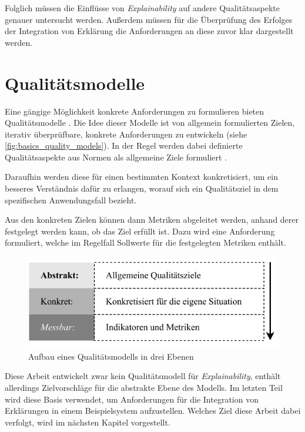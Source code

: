 Folglich müssen die Einflüsse von \textit{Explainability} auf andere Qualitätsaspekte genauer untersucht werden. Außerdem müssen für die Überprüfung des Erfolges der Integration von Erklärung die Anforderungen an diese zuvor klar dargestellt werden.

\section{Qualitätsmodelle}
\label{sec:basics_quality_models}

Eine gängige Möglichkeit konkrete Anforderungen zu formulieren bieten Qualitätsmodelle \cite{schneider2012abenteuer}. Die Idee dieser Modelle ist von allgemein formulierten Zielen, iterativ überprüfbare, konkrete Anforderungen zu entwickeln (siehe \autoref{fig:basics_quality_models}). In der Regel werden dabei definierte Qualitätsaspekte aus Normen als allgemeine Ziele formuliert \cite[vgl.][]{schneider2012abenteuer}.

Daraufhin werden diese für einen bestimmten Kontext konkretisiert, um ein besseres Verständnis dafür zu erlangen, worauf sich ein Qualitätsziel in dem spezifischen Anwendungsfall bezieht.

Aus den konkreten Zielen können dann Metriken abgeleitet werden, anhand derer festgelegt werden kann, ob das Ziel erfüllt ist. Dazu wird eine Anforderung formuliert, welche im Regelfall Sollwerte für die festgelegten Metriken enthält.

\begin{figure}[htb!]
    \centering
    \includegraphics{contents/02_basics/res/quality_models.pdf}
    \caption{Aufbau eines Qualitätsmodells in drei Ebenen \cite[S. 34, ][]{schneider2012abenteuer}}
    \label{fig:basics_quality_models}
\end{figure}

Diese Arbeit entwickelt zwar kein Qualitätsmodell für \textit{Explainability}, enthält allerdings Zielvorschläge für die abstrakte Ebene des Modells. Im letzten Teil wird diese Basis verwendet, um Anforderungen für die Integration von Erklärungen in einem Beispielsystem aufzustellen. Welches Ziel diese Arbeit dabei verfolgt, wird im nächsten Kapitel vorgestellt.



